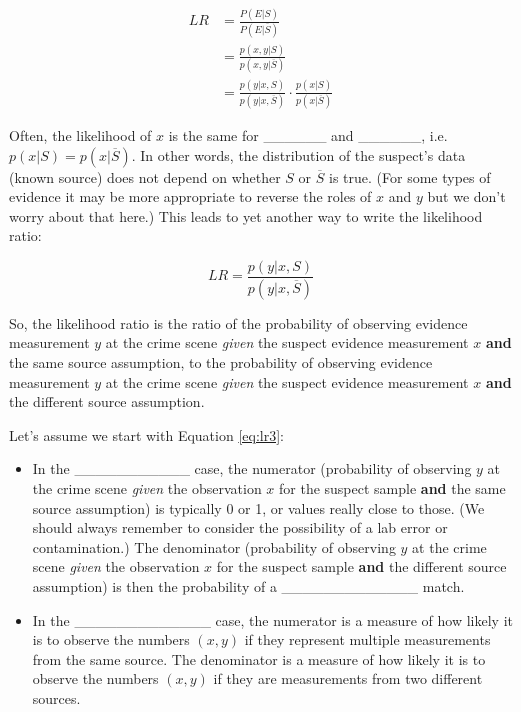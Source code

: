 \documentclass[]{book}
\providecommand{\tightlist}{%
  \setlength{\itemsep}{0pt}\setlength{\parskip}{0pt}}
\theoremstyle{definition}
\theoremstyle{definition}
\theoremstyle{remark}
\begin{document}
\begin{equation}\label{eq:lrredo}
\begin{split}
LR & = \frac{P(E|S)}{P(E|\overline{S})} \\
  & = \frac{p(x,y | S)}{p(x,y | \overline{S})} \\ 
  & = \frac{p(y | x, S)}{p(y | x, \overline{S})} \cdot \frac{p(x| S)}{p(x| \overline{S})} 
\end{split}
\end{equation}

Often, the likelihood of \(x\) is the same for \_\_\_\_\_\_ and
\_\_\_\_\_\_, i.e. \(p(x| S)= p(x| \overline{S})\). In other words, the
distribution of the suspect's data (known source) does not depend on
whether \(S\) or \(\overline{S}\) is true. (For some types of evidence
it may be more appropriate to reverse the roles of \(x\) and \(y\) but
we don't worry about that here.) This leads to yet another way to write
the likelihood ratio:

\begin{equation}\label{eq:lr3}
LR = \frac{p(y | x, S)}{p(y | x, \overline{S})}
\end{equation}

So, the likelihood ratio is the ratio of the probability of observing
evidence measurement \(y\) at the crime scene \emph{given} the suspect
evidence measurement \(x\) \textbf{and} the same source assumption, to
the probability of observing evidence measurement \(y\) at the crime
scene \emph{given} the suspect evidence measurement \(x\) \textbf{and}
the different source assumption.

Let's assume we start with Equation \ref{eq:lr3}:

\begin{itemize}
\tightlist
\item
  In the \_\_\_\_\_\_\_\_\_\_\_ case, the numerator (probability of
  observing \(y\) at the crime scene \emph{given} the observation \(x\)
  for the suspect sample \textbf{and} the same source assumption) is
  typically 0 or 1, or values really close to those. (We should always
  remember to consider the possibility of a lab error or contamination.)
  The denominator (probability of observing \(y\) at the crime scene
  \emph{given} the observation \(x\) for the suspect sample \textbf{and}
  the different source assumption) is then the probability of a
  \_\_\_\_\_\_\_\_\_\_\_\_\_ match. \vspace{.1in}
\item
  In the \_\_\_\_\_\_\_\_\_\_\_\_\_ case, the numerator is a measure of
  how likely it is to observe the numbers \((x,y)\) if they represent
  multiple measurements from the same source. The denominator is a
  measure of how likely it is to observe the numbers \((x,y)\) if they
  are measurements from two different sources.
\end{itemize}
\end{document}
